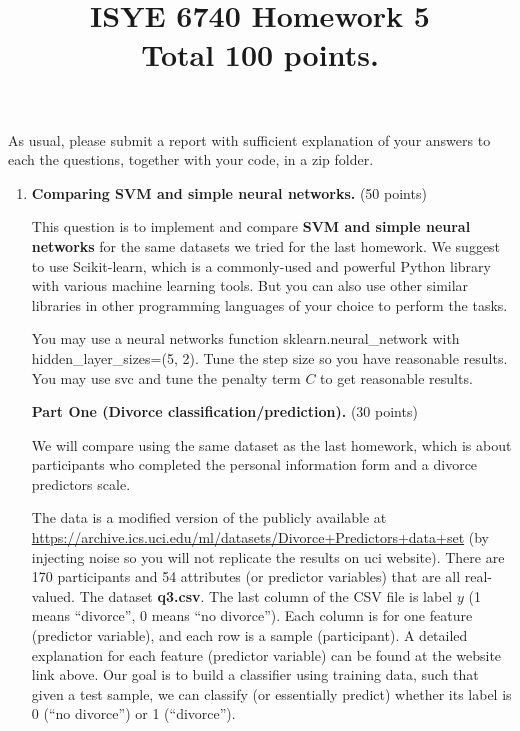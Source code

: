 \documentclass[twoside,10pt]{article}
\begin{document}
\title{ISYE 6740 Homework 5\\ 
\small Total 100 points.}
\date{}
\maketitle



As usual, please submit a report with sufficient explanation of your answers to each the questions, together with your code, in a zip folder.


\begin{enumerate}

\item {\bf Comparing SVM and simple neural networks.} (50 points)

This question is to implement and compare {\bf SVM and simple neural networks} for the same datasets we tried for the last homework. We suggest to use \textsf{Scikit-learn}, which is a commonly-used and powerful \textsf{Python} library with various machine learning tools. But you can also use other similar libraries in other programming languages of your choice to perform the tasks. 

You may use a neural networks function \textsf{sklearn.neural\_network} with \textsf{hidden\_layer\_sizes=(5, 2)}. Tune the step size so you have reasonable results. You may use \textsf{svc} and tune the penalty term $C$ to get reasonable results. 

\textbf{Part One (Divorce classification/prediction).} (30 points) 

We will compare using the same dataset as the last homework, which is about participants who completed the personal information form and a divorce predictors scale. 

The data is a modified version of the publicly available at \url{https://archive.ics.uci.edu/ml/datasets/Divorce+Predictors+data+set} (by injecting noise so you will not replicate the results on uci website). There are 170 participants and 54 attributes (or predictor variables) that are all real-valued. The dataset \textbf{q3.csv}. The last column of the CSV file is label $y$ (1 means ``divorce'', 0 means ``no divorce''). Each column is for one feature (predictor variable), and each row is a sample (participant). A detailed explanation for each feature (predictor variable) can be found at the website link above. Our goal is to build a classifier using training data, such that given a test sample, we can classify (or essentially predict) whether its label is 0 (``no divorce'') or 1 (``divorce''). 


\end{enumerate}
\end{document}
